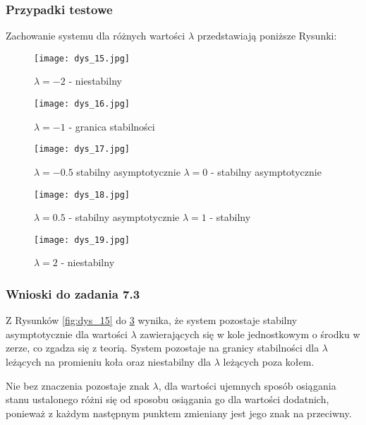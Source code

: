 \documentclass[a4paper,11pt]{article}
\begin{document}
\subsubsection{Przypadki testowe}
Zachowanie systemu dla różnych wartości \( \lambda \) przedstawiają poniższe Rysunki: \\
 
\begin{figure}[!htb]
  \texttt{[image: dys\_15.jpg]}
  \caption{\( \lambda=-2\) - niestabilny }\label{fig:dys_15}
\endminipage\hfill
{}

  \texttt{[image: dys\_16.jpg]}
  \caption{\( \lambda = -1\) - granica stabilności}\label{dys_16}

\endminipage
\end{figure}


\begin{figure}[!htb]
  \texttt{[image: dys\_17.jpg]}
  \caption{\( \lambda = -0.5 \) stabilny asymptotycznie \( \lambda = 0 \)  - stabilny asymptotycznie }\label{fig:dys_17}
\endminipage\hfill
{}

  \texttt{[image: dys\_18.jpg]}
  \caption{ \( \lambda=0.5 \) - stabilny asymptotycznie \( \lambda=1 \) - stabilny}\label{fig:dys_18}

\endminipage
\end{figure}


\begin{figure}[H]
\centerline{\texttt{[image: dys\_19.jpg]}}
\caption{\( \lambda = 2 \) - niestabilny}
\label{fig:dys_19}
\end{figure}
 

\subsubsection{Wnioski do zadania 7.3}
Z Rysunków \ref{fig:dys_15} do \ref{fig:dys_19} wynika, że system pozostaje stabilny asymptotycznie dla wartości $ \lambda $ zawierających się w kole jednostkowym o środku w zerze, co zgadza się z teorią. System pozostaje na granicy stabilności dla $ \lambda $ leżących na promieniu koła oraz niestabilny dla $ \lambda $ leżących poza kołem.

Nie bez znaczenia pozostaje znak $ \lambda $, dla wartości ujemnych sposób osiągania stanu ustalonego różni się od sposobu osiągania go dla wartości dodatnich, ponieważ z każdym następnym punktem zmieniany jest jego znak na przeciwny. 
\end{document}
